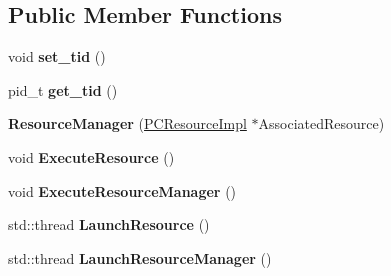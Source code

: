 \subsection*{Public Member Functions}
\begin{DoxyCompactItemize}
\item 
void {\bfseries set\+\_\+tid} ()\hypertarget{classpc__emulator_1_1ResourceManager_a808419c2595d9f2084826dcd61f6d05b}{}\label{classpc__emulator_1_1ResourceManager_a808419c2595d9f2084826dcd61f6d05b}

\item 
pid\+\_\+t {\bfseries get\+\_\+tid} ()\hypertarget{classpc__emulator_1_1ResourceManager_ad651db34852b627a222e802564887c22}{}\label{classpc__emulator_1_1ResourceManager_ad651db34852b627a222e802564887c22}

\item 
{\bfseries Resource\+Manager} (\hyperlink{classpc__emulator_1_1PCResourceImpl}{P\+C\+Resource\+Impl} $\ast$Associated\+Resource)\hypertarget{classpc__emulator_1_1ResourceManager_a342411d8f20e1a25699b9b3ada2968dc}{}\label{classpc__emulator_1_1ResourceManager_a342411d8f20e1a25699b9b3ada2968dc}

\item 
void {\bfseries Execute\+Resource} ()\hypertarget{classpc__emulator_1_1ResourceManager_a8f3e065bf68a40e88b8e1dc71e70480d}{}\label{classpc__emulator_1_1ResourceManager_a8f3e065bf68a40e88b8e1dc71e70480d}

\item 
void {\bfseries Execute\+Resource\+Manager} ()\hypertarget{classpc__emulator_1_1ResourceManager_ad1ca07861c6f5a276c76a11fc5255c21}{}\label{classpc__emulator_1_1ResourceManager_ad1ca07861c6f5a276c76a11fc5255c21}

\item 
std\+::thread {\bfseries Launch\+Resource} ()\hypertarget{classpc__emulator_1_1ResourceManager_aaee2535ac7c878169d7f32fa7fa344fe}{}\label{classpc__emulator_1_1ResourceManager_aaee2535ac7c878169d7f32fa7fa344fe}

\item 
std\+::thread {\bfseries Launch\+Resource\+Manager} ()\hypertarget{classpc__emulator_1_1ResourceManager_aae39d5ff38fbc3475f816826952c81c8}{}\label{classpc__emulator_1_1ResourceManager_aae39d5ff38fbc3475f816826952c81c8}

\end{DoxyCompactItemize}
